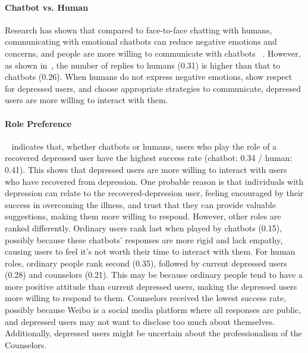 \paragraph{Chatbot vs. Human}
Research has shown that compared to face-to-face chatting with humans, communicating with emotional chatbots can reduce negative emotions and concerns, and people are more willing to communicate with chatbots ~\cite{drouin2022chatting}.
However, as shown in~, the number of replies to humans (0.31) is higher than that to chatbots (0.26). When humans do not express negative emotions, show respect for depressed users, and choose appropriate strategies to communicate, depressed users are more willing to interact with them.

\paragraph{Role Preference}
~ indicates that, whether chatbots or humans, users who play the role of a recovered depressed user have the highest success rate (chatbot: 0.34 / human: 0.41). This shows that depressed users are more willing to interact with users who have recovered from depression. One probable reason is that individuals with depression can relate to the recovered-depression user, feeling encouraged by their success in overcoming the illness, and trust that they can provide valuable suggestions, making them more willing to respond.
However, other roles are ranked differently. Ordinary users rank last when played by chatbots (0.15), possibly because these chatbots' responses are more rigid and lack empathy, causing users to feel it's not worth their time to interact with them. For human roles, ordinary people rank second (0.35), followed by current depressed users (0.28) and counselors (0.21). This may be because ordinary people tend to have a more positive attitude than current depressed users, making the depressed users more willing to respond to them. Counselors received the lowest success rate, possibly because Weibo is a social media platform where all responses are public, and depressed users may not want to disclose too much about themselves. Additionally, depressed users might be uncertain about the professionalism of the Counselors.

